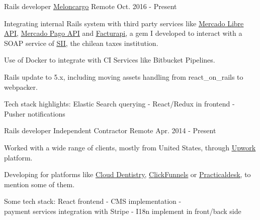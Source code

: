 
\begin{cventries}

  \cventry
    {Rails developer} %
    {\href{http://www.meloncargo.com/}{\underline{Meloncargo}}} %
    {Remote} %
    {Oct. 2016 - Present} %
    {
      \begin{cvitems} %
        \item { Integrating internal Rails system with third party services like
                \href{http://developers.mercadolibre.com/}{\underline{Mercado Libre API}},
                \href{https://www.mercadopago.com.br/developers/es/api-docs/}{\underline{Mercado Pago API}}
                and \href{https://github.com/alagos/facturapi}{\underline{Facturapi}},
                a gem I developed to interact with a SOAP service of \href{http://www.sii.cl}{\underline{SII}},
                the chilean taxes institution. }
        \item { Use of Docker to integrate with CI Services like Bitbucket Pipelines. }
        \item { Rails update to 5.x, including moving assets handling from react\_on\_rails to webpacker. }
        \item { Tech stack highlights: Elastic Search querying - React/Redux in frontend - Pusher notifications }
      \end{cvitems}
    }

  \cventry
    {Rails developer} %
    {Independent Contractor} %
    {Remote} %
    {Apr. 2014 - Present} %
    {
      \begin{cvitems} %
        \item { Worked with a wide range of clients, mostly from United States, through
                \href{https://www.upwork.com/freelancers/~0165692cc0b947512e}{\underline{Upwork}} platform.}
        \item { Developing for platforms like
                \href{https://www.clouddentistry.com/}{\underline{Cloud Dentistry}},
                \href{https://www.clickfunnels.com/}{\underline{ClickFunnels}} or
                \href{https://practicaldesk.com/}{\underline{Practicaldesk}},
                to mention some of them.}
        \item { Some tech stack: React frontend - CMS implementation - \\
                payment services integration with Stripe - I18n implement in front/back side}
      \end{cvitems}
    }


\end{cventries}

